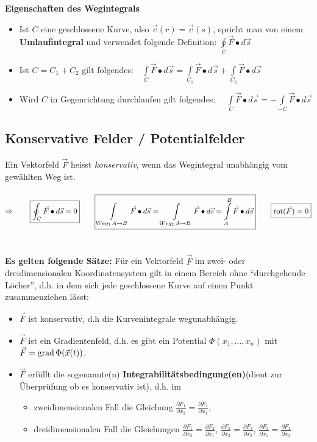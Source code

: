   \textbf{Eigenschaften des Wegintegrals}
  \begin{itemize}
    \item Ist $C$ eine geschlossene Kurve, also $\vec{c}(r)=\vec{c}(s)$, spricht
    man von einem \textbf{Umlaufintegral} und verwendet folgende Definition:
    $\oint\limits_C \vec{F}\bullet d\vec{s}$
    \item Ist $C=C_1+C_2$ gilt folgendes:$\quad\int\limits_C \vec{F}\bullet
    d\vec{s}=\int\limits_{C_1} \vec{F}\bullet d\vec{s}+\int\limits_{C_2}
    \vec{F}\bullet d\vec{s}$
    \item Wird $C$ in Gegenrichtung durchlaufen gilt folgendes:
    $\quad\int\limits_C \vec{F}\bullet
    d\vec{s}=-\int\limits_{-C} \vec{F}\bullet d\vec{s}$
  \end{itemize}

\subsection{Konservative Felder / Potentialfelder}
  Ein Vektorfeld $\vec{F}$ heisst \textit{konservativ}, wenn das Wegintegral
  unabhängig vom gewählten Weg ist.\\\\
  $\Rightarrow\qquad \boxed{\oint_C \vec{F}\bullet d\vec{s}=0}\qquad\boxed{
  \int\limits_{Weg_1\, A\rightarrow B} \vec{F}\bullet d\vec{s}=\int\limits_{Weg_2\,
  A\leadsto B} \vec{F}\bullet d\vec{s}=\int\limits_A^B \vec{F}\bullet
  d\vec{s}}\qquad\boxed{\operatorname{rot} (\vec{F})=0}$\\\\\\	
  \textbf{Es gelten folgende Sätze:}
  Für ein Vektorfeld $\vec{F}$ im zwei- oder dreidimensionalen Koordinatensystem
  gilt in einem Bereich ohne "`durchgehende Löcher"', d.h. in dem sich jede
  geschlossene Kurve auf einen Punkt zusammenziehen lässt:
  \begin{itemize}
    \item $\vec{F}$ ist konservativ, d.h die Kurvenintegrale wegunabhängig.
    \item $\vec{F}$ ist ein Gradientenfeld, d.h. es gibt ein Potential
    $\Phi(x_1,\ldots,x_n)$ mit $\vec{F}=\operatorname{grad} \Phi(\vec{x}(t))$.
    \item $\vec{F}$ erfüllt die sogenannte(n)
    \textbf{Integrabilitätsbedingung(en)}(dient zur Überprüfung ob es konservativ ist), d.h. im
    \begin{itemize}
      \item zweidimensionalen Fall die Gleichung $\frac{\partial F_1}{\partial
      x_2}=\frac{\partial F_2}{\partial x_1}$,
      \item dreidimensionalen Fall die Gleichungen $\frac{\partial F_1}{\partial
      x_2}=\frac{\partial F_2}{\partial x_1}$, $\frac{\partial F_2}{\partial
      x_3}=\frac{\partial F_3}{\partial x_2}$, $\frac{\partial F_3}{\partial
      x_1}=\frac{\partial F_1}{\partial x_3}$
    \end{itemize}
  \end{itemize}
